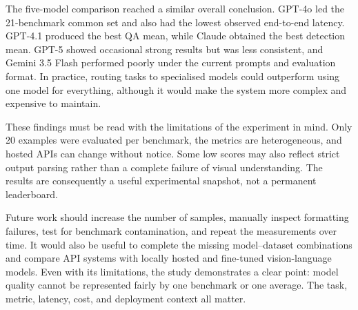﻿\documentclass[11pt,a4paper]{article}
\begin{document}
The five-model comparison reached a similar overall conclusion. GPT-4o led
the 21-benchmark common set and also had the lowest observed end-to-end
latency. GPT-4.1 produced the best QA mean, while Claude obtained the best
detection mean. GPT-5 showed occasional strong results but was less consistent,
and Gemini 3.5 Flash performed poorly under the current prompts and evaluation
format. In practice, routing tasks to specialised models could outperform
using one model for everything, although it would make the system more complex
and expensive to maintain.

These findings must be read with the limitations of the experiment in mind.
Only 20 examples were evaluated per benchmark, the metrics are heterogeneous,
and hosted APIs can change without notice. Some low scores may also reflect
strict output parsing rather than a complete failure of visual understanding.
The results are consequently a useful experimental snapshot, not a permanent
leaderboard.

Future work should increase the number of samples, manually inspect formatting
failures, test for benchmark contamination, and repeat the measurements over
time. It would also be useful to complete the missing model--dataset
combinations and compare API systems with locally hosted and fine-tuned
vision-language models. Even with its limitations, the study demonstrates a
clear point: model quality cannot be represented fairly by one benchmark or
one average. The task, metric, latency, cost, and deployment context all matter.

\clearpage
\end{document}
